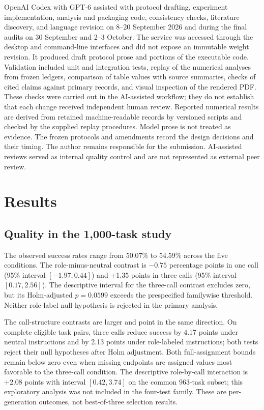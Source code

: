 OpenAI Codex with GPT-6 assisted with protocol drafting, experiment implementation, analysis and packaging code, consistency checks, literature discovery, and language revision on 8--20 September 2026 and during the final audits on 30 September and 2--3 October. The service was accessed through the desktop and command-line interfaces and did not expose an immutable weight revision. It produced draft protocol prose and portions of the executable code. Validation included unit and integration tests, replay of the numerical analyses from frozen ledgers, comparison of table values with source summaries, checks of cited claims against primary records, and visual inspection of the rendered PDF. These checks were carried out in the AI-assisted workflow; they do not establish that each change received independent human review. Reported numerical results are derived from retained machine-readable records by versioned scripts and checked by the supplied replay procedures. Model prose is not treated as evidence. The frozen protocols and amendments record the design decisions and their timing. The author remains responsible for the submission. AI-assisted reviews served as internal quality control and are not represented as external peer review.

\section{Results}
\subsection{Quality in the 1,000-task study}
The observed success rates range from 50.07\% to 54.59\% across the five conditions. The role-minus-neutral contrast is $-0.75$ percentage points in one call (95\% interval $[-1.97,0.44]$) and $+1.35$ points in three calls (95\% interval $[0.17,2.56]$). The descriptive interval for the three-call contrast excludes zero, but its Holm-adjusted $p=0.0599$ exceeds the prespecified familywise threshold. Neither role-label null hypothesis is rejected in the primary analysis.

The call-structure contrasts are larger and point in the same direction. On complete eligible task pairs, three calls reduce success by 4.17 points under neutral instructions and by 2.13 points under role-labeled instructions; both tests reject their null hypotheses after Holm adjustment. Both full-assignment bounds remain below zero even when missing endpoints are assigned values most favorable to the three-call condition. The descriptive role-by-call interaction is $+2.08$ points with interval $[0.42,3.74]$ on the common 963-task subset; this exploratory analysis was not included in the four-test family. These are per-generation outcomes, not best-of-three selection results.


